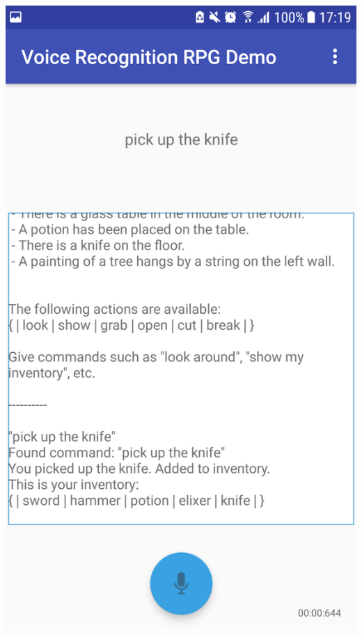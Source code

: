 \documentclass[11pt]{article}
\begin{document}
\begin{center}
\includegraphics[scale=0.18]{overworld-1.png}

\end{center}
\end{document}

